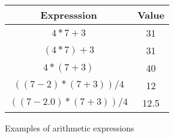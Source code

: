 




\begin {figure}


\begin{tabular} {c c }
Expresssion	&    Value  \\
\hline
$4*7+3 $ 	&		31	 \\
$(4*7)+3 $	&		31 	 \\
$4*(7+3) $   	&		40	 \\
$((7-2)*(7+3))/4 $ &   		12	 \\
$((7-2.0)*(7+3))/4 $ &   	12.5	 \\
\end {tabular}

\caption {Examples of arithmetic expressions}
\label {fig:exprs}

\end {figure}


